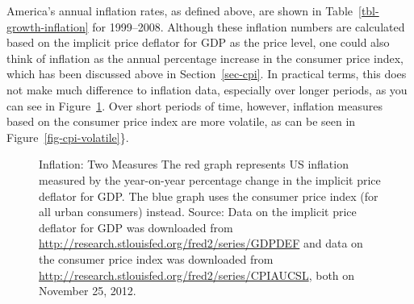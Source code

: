 \documentclass[
  letterpaper,
]{book}
\theoremstyle{plain}
\theoremstyle{remark}
\begin{document}
America's annual inflation rates, as defined above, are shown in
Table~\ref{tbl-growth-inflation} for 1999--2008. Although these
inflation numbers are calculated based on the implicit price deflator
for GDP as the price level, one could also think of inflation as the
annual percentage increase in the consumer price index, which has been
discussed above in Section~\ref{sec-cpi}. In practical terms, this does
not make much difference to inflation data, especially over longer
periods, as you can see in Figure~\ref{fig-inflation}. Over short
periods of time, however, inflation measures based on the consumer price
index are more volatile, as can be seen in
Figure~\ref{fig-cpi-volatile}\}.

\begin{figure}


\caption{\label{fig-inflation}Inflation: Two Measures The red graph
represents US inflation measured by the year-on-year percentage change
in the implicit price deflator for GDP. The blue graph uses the consumer
price index (for all urban consumers) instead. Source: Data on the
implicit price deflator for GDP was downloaded from
\url{http://research.stlouisfed.org/fred2/series/GDPDEF} and data on the
consumer price index was downloaded from
\url{http://research.stlouisfed.org/fred2/series/CPIAUCSL}, both on
November 25, 2012.}

\end{figure}%
\end{document}
